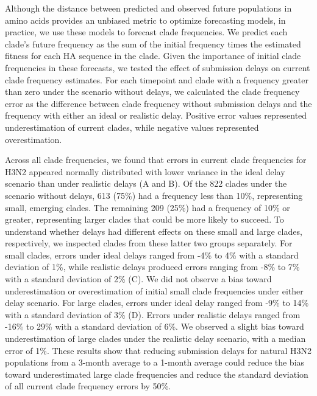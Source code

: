 \documentclass[9pt,lineno]{elife}
\begin{document}
Although the distance between predicted and observed future populations in amino acids provides an unbiased metric to optimize forecasting models, in practice, we use these models to forecast clade frequencies.
We predict each clade's future frequency as the sum of the initial frequency times the estimated fitness for each HA sequence in the clade.
Given the importance of initial clade frequencies in these forecasts, we tested the effect of submission delays on current clade frequency estimates.
For each timepoint and clade with a frequency greater than zero under the scenario without delays, we calculated the clade frequency error as the difference between clade frequency without submission delays and the frequency with either an ideal or realistic delay.
Positive error values represented underestimation of current clades, while negative values represented overestimation.

Across all clade frequencies, we found that errors in current clade frequencies for H3N2 appeared normally distributed with lower variance in the ideal delay scenario than under realistic delays (A and B).
Of the 822 clades under the scenario without delays, 613 (75\%) had a frequency less than 10\%, representing small, emerging clades.
The remaining 209 (25\%) had a frequency of 10\% or greater, representing larger clades that could be more likely to succeed.
To understand whether delays had different effects on these small and large clades, respectively, we inspected clades from these latter two groups separately.
For small clades, errors under ideal delays ranged from -4\% to 4\% with a standard deviation of 1\%, while realistic delays produced errors ranging from -8\% to 7\% with a standard deviation of 2\% (C).
We did not observe a bias toward underestimation or overestimation of initial small clade frequencies under either delay scenario.
For large clades, errors under ideal delay ranged from -9\% to 14\% with a standard deviation of 3\% (D).
Errors under realistic delays ranged from -16\% to 29\% with a standard deviation of 6\%.
We observed a slight bias toward underestimation of large clades under the realistic delay scenario, with a median error of 1\%.
These results show that reducing submission delays for natural H3N2 populations from a 3-month average to a 1-month average could reduce the bias toward underestimated large clade frequencies and reduce the standard deviation of all current clade frequency errors by 50\%.
\end{document}
